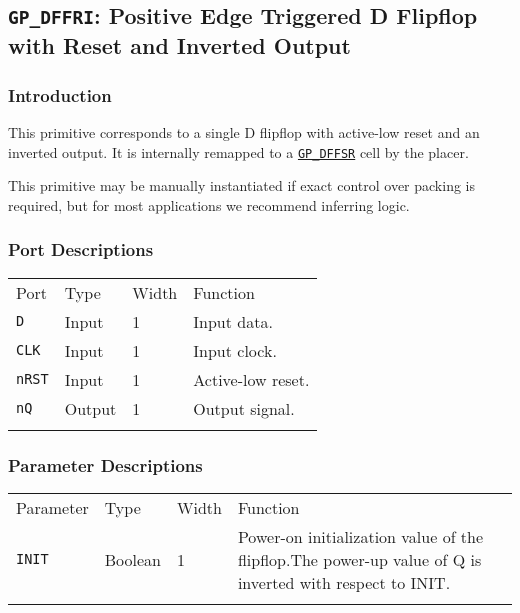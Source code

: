 \documentclass[11pt]{article}
\newcommand{\tokenstyle}[1]{\texttt{#1}}
\newcommand{\whenstyle}[1]{{\fontseries{sb}\selectfont#1}}
\newcommand{\tokenref}[2]{\hyperref[#2]{\tokenstyle{#1}}}
\newcommand{\thinhline}{\Xhline{1\arrayrulewidth}}
\newcommand{\thickhline}{\Xhline{2.5\arrayrulewidth}}
\begin{document}
\pagebreak
\subsection{\tokenstyle{GP\_DFFRI}: Positive Edge Triggered D Flipflop with Reset and Inverted Output}
\label{gp-dffr}

\subsubsection{Introduction}
This primitive corresponds to a single D flipflop with active-low reset and an inverted output. It is internally 
remapped to a \tokenref{GP\_DFFSR}{gp-dffsr} cell by the placer.

This primitive may be manually instantiated if exact control over packing is required, but for most applications we
recommend inferring logic.

\subsubsection{Port Descriptions}

\begin{tabularx}{\textwidth}{lllX}
\thinhline
\whenstyle{Port} & \whenstyle{Type} & \whenstyle{Width} & \whenstyle{Function} \\
\thickhline
\tokenstyle{D} & Input & 1 & Input data. \\
\thinhline
\tokenstyle{CLK} & Input & 1 & Input clock. \\
\thinhline
\tokenstyle{nRST} & Input & 1 & Active-low reset. \\
\thinhline
\tokenstyle{nQ} & Output & 1 & Output signal. \\
\thinhline
\end{tabularx}

\subsubsection{Parameter Descriptions}

\begin{tabularx}{\textwidth}{lllX}
\thinhline
\whenstyle{Parameter} & \whenstyle{Type} & \whenstyle{Width} & \whenstyle{Function} \\
\thickhline
\tokenstyle{INIT} & Boolean & 1 & Power-on initialization value of the flipflop.\newline The power-up value of Q is inverted 
with respect to INIT.\\
\thinhline
\end{tabularx}
\end{document}
